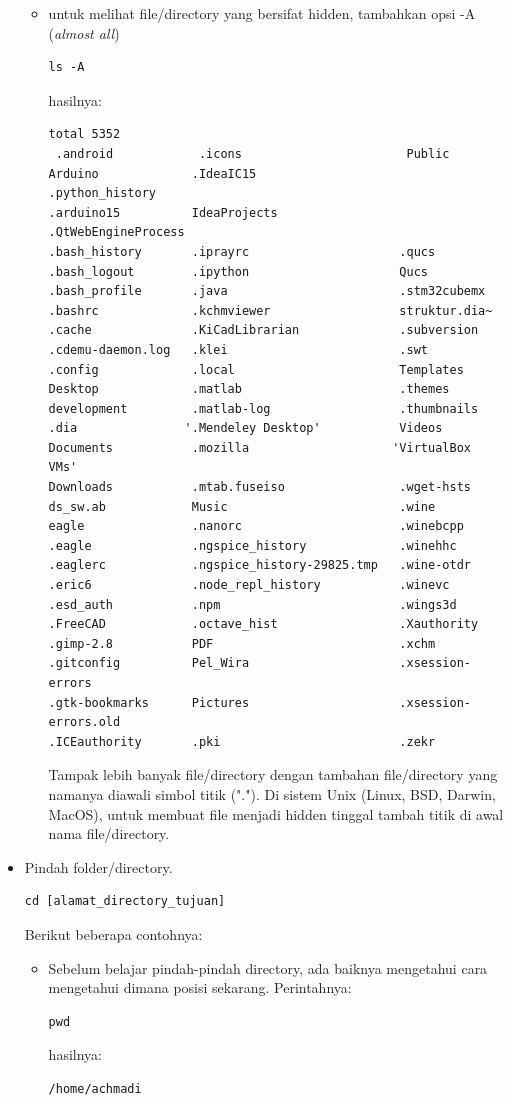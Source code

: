 \documentclass[12pt,]{article}
\begin{document}
\begin{itemize}
\begin{itemize}
			\item untuk melihat file/directory yang bersifat hidden, tambahkan opsi -A (\textit{almost all})
			\begin{verbatim}
ls -A
			\end{verbatim}
			hasilnya:
			\begin{verbatim}
total 5352
 .android            .icons                       Public
Arduino             .IdeaIC15                    .python_history
.arduino15          IdeaProjects                 .QtWebEngineProcess
.bash_history       .iprayrc                     .qucs
.bash_logout        .ipython                     Qucs
.bash_profile       .java                        .stm32cubemx
.bashrc             .kchmviewer                  struktur.dia~
.cache              .KiCadLibrarian              .subversion
.cdemu-daemon.log   .klei                        .swt
.config             .local                       Templates
Desktop             .matlab                      .themes
development         .matlab-log                  .thumbnails
.dia               '.Mendeley Desktop'           Videos
Documents           .mozilla                    'VirtualBox VMs'
Downloads           .mtab.fuseiso                .wget-hsts
ds_sw.ab            Music                        .wine
eagle               .nanorc                      .winebcpp
.eagle              .ngspice_history             .winehhc
.eaglerc            .ngspice_history-29825.tmp   .wine-otdr
.eric6              .node_repl_history           .winevc
.esd_auth           .npm                         .wings3d
.FreeCAD            .octave_hist                 .Xauthority
.gimp-2.8           PDF                          .xchm
.gitconfig          Pel_Wira                     .xsession-errors
.gtk-bookmarks      Pictures                     .xsession-errors.old
.ICEauthority       .pki                         .zekr
			\end{verbatim}
			Tampak lebih banyak file/directory dengan tambahan file/directory yang namanya diawali simbol titik (".").
			Di sistem Unix (Linux, BSD, Darwin, MacOS), untuk membuat file menjadi hidden tinggal tambah titik di awal nama file/directory.
		\end{itemize}

		\item Pindah folder/directory.
		\begin{verbatim}
cd [alamat_directory_tujuan]
		\end{verbatim}
		Berikut beberapa contohnya:
		\begin{itemize}
			\item Sebelum belajar pindah-pindah directory, ada baiknya mengetahui cara mengetahui dimana posisi sekarang.
			Perintahnya:
			\begin{verbatim}
pwd
			\end{verbatim}
			hasilnya:
			\begin{verbatim}
/home/achmadi
			\end{verbatim}


\end{itemize}
\end{itemize}
\end{document}
